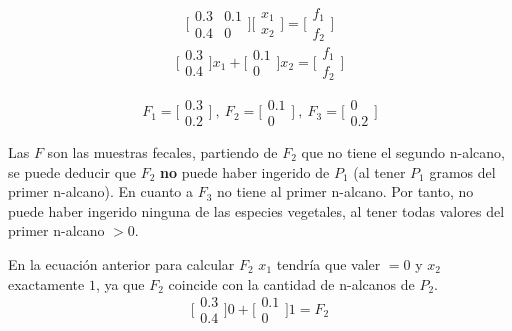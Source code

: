 \documentclass[11pt]{article}
\begin{document}
\LARGE
$$\bigl[\begin{smallmatrix} 0.3 & 0.1\\ 0.4 & 0 \end{smallmatrix}\bigr] \bigl[\begin{smallmatrix} x_1\\ x_2\end{smallmatrix}\bigr] = \bigl[\begin{smallmatrix} f_1\\ f_2\end{smallmatrix}\bigr]$$
$$\bigl[\begin{smallmatrix} 0.3\\ 0.4\end{smallmatrix}\bigr] x_1 + \bigl[\begin{smallmatrix} 0.1\\ 0\end{smallmatrix}\bigr] x_2  = \bigl[\begin{smallmatrix} f_1\\ f_2\end{smallmatrix}\bigr]$$
\normalsize

$$F_1 = \bigl[\begin{smallmatrix} 0.3\\ 0.2 \end{smallmatrix}\bigr] \:,\: F_2 = \bigl[\begin{smallmatrix} 0.1\\ 0 \end{smallmatrix}\bigr] \:,\: F_3 = \bigl[\begin{smallmatrix} 0\\ 0.2 \end{smallmatrix}\bigr]$$

Las $F$ son las muestras fecales, partiendo de $F_2$ que no tiene el segundo n-alcano, se puede deducir que $F_2$ \textbf{no} puede haber ingerido de $P_1$ (al tener $P_1$ gramos del primer n-alcano). En cuanto a $F_3$ no tiene al primer n-alcano. Por tanto, no puede haber ingerido ninguna de las especies vegetales, al tener todas valores del primer n-alcano $> 0$.

En la ecuación anterior para calcular $F_2$ $x_1$ tendría que valer $= 0$ y $x_2$ exactamente $1$, ya que $F_2$ coincide con la cantidad de n-alcanos de $P_2$.
\LARGE
$$\bigl[\begin{smallmatrix} 0.3\\ 0.4\end{smallmatrix}\bigr] 0 + \bigl[\begin{smallmatrix} 0.1\\ 0\end{smallmatrix}\bigr] 1  = F_2$$
\normalsize
\end{document}
